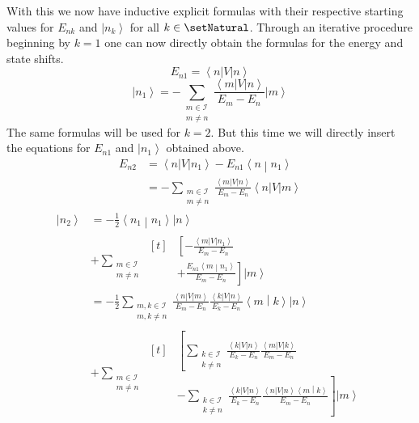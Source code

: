 \documentclass[10pt,fleqn]{article}
\newcommand{\bra}[1]{\left\langle #1 \right\vert}
\newcommand{\ket}[1]{\left\vert #1 \right\rangle}
\newcommand{\bracket}[2]{\left\langle #1 \middle\vert #2 \right\rangle}
\begin{document}
\begin{multicols}{2}
      With this we now have inductive explicit formulas with their respective starting values for $E_{nk}$ and $\ket{n_k}$ for all $k\in\setNatural$.
      Through an iterative procedure beginning by $k=1$ one can now directly obtain the formulas for the energy and state shifts.
      \[
        E_{n1} = \bra{n}V\ket{n}
      \]
      \[
        \ket{n_1} = - \sum_{\substack{m\in\mathscr{I} \\ m\neq n}} \frac{\bra{m}V\ket{n}}{E_m-E_n} \ket{m}
      \]
      The same formulas will be used for $k=2$.
      But this time we will directly insert the equations for $E_{n1}$ and $\ket{n_1}$ obtained above.
      \begin{align*}
        E_{n2}
        &= \bra{n}V\ket{n_1} - E_{n1}\bracket{n}{n_1} \\
        &= -\sum_{\substack{m\in\mathscr{I} \\ m\neq n}} \frac{\bra{m}V\ket{n}}{E_m-E_n} \bra{n}V\ket{m}
      \end{align*}
      \begin{align*}
        \ket{n_2}
        &= -\frac{1}{2} \bracket{n_1}{n_{1}}\ket{n} \\
        &+ \sum_{\substack{m\in\mathscr{I}\\m\neq n}}
          \begin{aligned}[t]
            &\left[ -\frac{\bra{m}V\ket{n_{1}}}{E_m-E_n} \right. \\
            &\left. + \frac{E_{n1}\bracket{m}{n_{1}}}{E_m - E_n} \right] \ket{m}
          \end{aligned}
        \\
        &= -\frac{1}{2} \sum_{\substack{m,k\in\mathscr{I}\\m,k\neq n}} \frac{\bra{n}V\ket{m}}{E_m-E_n} \frac{\bra{k}V\ket{n}}{E_k-E_n} \bracket{m}{k} \ket{n} \\
        &+ \sum_{\substack{m\in\mathscr{I}\\m\neq n}}
          \begin{aligned}[t]
            &\left[ \sum_{\substack{k\in\mathscr{I} \\ k\neq n}} \frac{\bra{k}V\ket{n}}{E_k-E_n} \frac{\bra{m}V\ket{k}}{E_m-E_n} \right. \\
            &\left. - \sum_{\substack{k\in\mathscr{I} \\ k\neq n}} \frac{\bra{k}V\ket{n}}{E_k-E_n} \frac{\bra{n}V\ket{n} \bracket{m}{k}}{E_m - E_n} \right] \ket{m}
          \end{aligned}
        \\

\end{align*}
\end{multicols}
\end{document}
